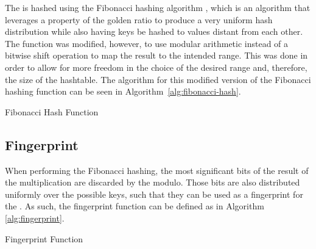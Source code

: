 The \kmer is hashed using the Fibonacci hashing algorithm \cite{}, which is an algorithm that leverages a property of the golden ratio
to produce a very uniform hash distribution while also having  keys be hashed to values distant from each other. The function was modified, however, to use modular arithmetic instead of a bitwise shift operation to map the result to the intended range. This was done in order to allow for more freedom in the choice of the desired range and, therefore, the size of the
hashtable. The algorithm for this modified version of the Fibonacci hashing function can be seen in Algorithm~\ref{alg:fibonacci-hash}.

\begin{algorithm}
  \caption{Fibonacci Hash Function}\label{alg:fibonacci-hash}
\end{algorithm}

\subsection{Fingerprint}\label{sec:fingerprint}

When performing the Fibonacci hashing, the most significant bits of the result of the multiplication are discarded by the modulo.
Those bits are also distributed uniformly over the possible keys, such that they can be used as a fingerprint for the \kmer.
As such, the fingerprint function can be defined as in Algorithm \ref{alg:fingerprint}. 

\begin{algorithm}
  \caption{Fingerprint Function}\label{alg:fingerprint}
\end{algorithm}




